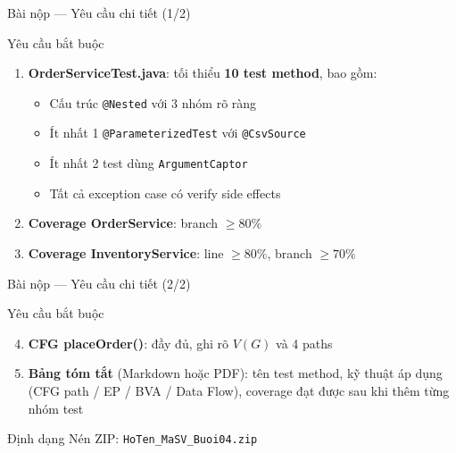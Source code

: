 \documentclass[aspectratio=169,10pt]{beamer}
\begin{document}
\begin{frame}{Bài nộp --- Yêu cầu chi tiết (1/2)}
  \begin{block}{Yêu cầu bắt buộc}
    \begin{enumerate}
      \item \textbf{OrderServiceTest.java}: tối thiểu \textbf{10 test method},
        bao gồm:
        \begin{itemize}
          \item Cấu trúc \texttt{@Nested} với 3 nhóm rõ ràng
          \item Ít nhất 1 \texttt{@ParameterizedTest} với \texttt{@CsvSource}
          \item Ít nhất 2 test dùng \texttt{ArgumentCaptor}
          \item Tất cả exception case có verify side effects
        \end{itemize}
      \item \textbf{Coverage OrderService}: branch $\geq 80\%$
      \item \textbf{Coverage InventoryService}: line $\geq 80\%$, branch $\geq 70\%$
    \end{enumerate}
  \end{block}
\end{frame}

\begin{frame}{Bài nộp --- Yêu cầu chi tiết (2/2)}
  \begin{block}{Yêu cầu bắt buộc}
    \begin{enumerate}
      \setcounter{enumi}{3}
      \item \textbf{CFG placeOrder()}: đầy đủ, ghi rõ $V(G)$ và 4 paths
      \item \textbf{Bảng tóm tắt} (Markdown hoặc PDF): tên test method,
        kỹ thuật áp dụng (CFG path / EP / BVA / Data Flow),
        coverage đạt được sau khi thêm từng nhóm test
    \end{enumerate}
  \end{block}

  \begin{alertblock}{Định dạng}
    Nén ZIP: \texttt{HoTen\_MaSV\_Buoi04.zip}
  \end{alertblock}
\end{frame}
\end{document}

